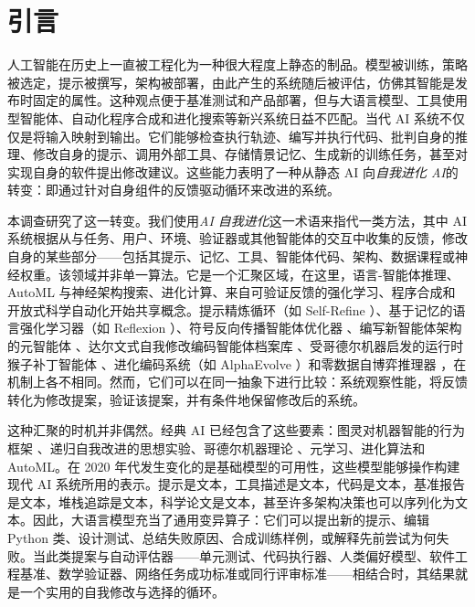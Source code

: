 \section{引言}
\label{sec:introduction}

人工智能在历史上一直被工程化为一种很大程度上静态的制品。模型被训练，策略被选定，提示被撰写，架构被部署，由此产生的系统随后被评估，仿佛其智能是发布时固定的属性。这种观点便于基准测试和产品部署，但与大语言模型、工具使用型智能体、自动化程序合成和进化搜索等新兴系统日益不匹配。当代 AI 系统不仅仅是将输入映射到输出。它们能够检查执行轨迹、编写并执行代码、批判自身的推理、修改自身的提示、调用外部工具、存储情景记忆、生成新的训练任务，甚至对实现自身的软件提出修改建议。这些能力表明了一种从静态 AI 向\emph{自我进化 AI}的转变：即通过针对自身组件的反馈驱动循环来改进的系统。

本调查研究了这一转变。我们使用\emph{AI 自我进化}这一术语来指代一类方法，其中 AI 系统根据从与任务、用户、环境、验证器或其他智能体的交互中收集的反馈，修改自身的某些部分——包括其提示、记忆、工具、智能体代码、架构、数据课程或神经权重。该领域并非单一算法。它是一个汇聚区域，在这里，语言-智能体推理、AutoML 与神经架构搜索、进化计算、来自可验证反馈的强化学习、程序合成和开放式科学自动化开始共享概念。提示精炼循环（如 Self-Refine \cite{selfrefine2023}）、基于记忆的语言强化学习器（如 Reflexion \cite{reflexion2023}）、符号反向传播智能体优化器 \cite{agentsymboliclearning2024}、编写新智能体架构的元智能体 \cite{adas2025}、达尔文式自我修改编码智能体档案库 \cite{darwingodelmachine2025}、受哥德尔机器启发的运行时猴子补丁智能体 \cite{yin2024godel,schmidhuber2003}、进化编码系统（如 AlphaEvolve \cite{alphaevolve2025}）和零数据自博弈推理器 \cite{absolutezero2025}，在机制上各不相同。然而，它们可以在同一抽象下进行比较：系统观察性能，将反馈转化为修改提案，验证该提案，并有条件地保留修改后的系统。

这种汇聚的时机并非偶然。经典 AI 已经包含了这些要素：图灵对机器智能的行为框架 \cite{turing1950computing}、递归自我改进的思想实验、哥德尔机器理论 \cite{schmidhuber2003}、元学习、进化算法和 AutoML。在 2020 年代发生变化的是基础模型的可用性，这些模型能够操作构建现代 AI 系统所用的表示。提示是文本，工具描述是文本，代码是文本，基准报告是文本，堆栈追踪是文本，科学论文是文本，甚至许多架构决策也可以序列化为文本。因此，大语言模型充当了通用变异算子：它们可以提出新的提示、编辑 Python 类、设计测试、总结失败原因、合成训练样例，或解释先前尝试为何失败。当此类提案与自动评估器——单元测试、代码执行器、人类偏好模型、软件工程基准、数学验证器、网络任务成功标准或同行评审标准——相结合时，其结果就是一个实用的自我修改与选择的循环。

